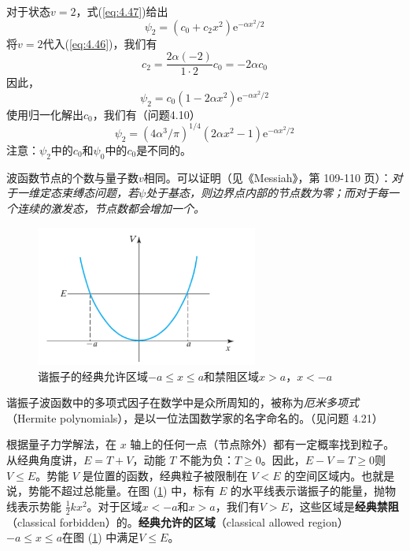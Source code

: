     对于状态$v=2$，式(\ref{eq:4.47})给出
    \begin{equation*}
        \psi_2 = \left(c_0 + c_2x^2\right)\mathrm{e}^{-\alpha x^2 / 2}
    \end{equation*}
    将$v=2$代入(\ref{eq:4.46})，我们有
    \begin{equation*}
        c_2 = \frac{2\alpha \left(-2\right)}{1\cdot2}c_0 = -2\alpha c_0
    \end{equation*}
    因此，
    \begin{equation}
        \psi_2 = c_0\left(1-2\alpha x^2\right)\mathrm{e}^{-\alpha x^2 / 2}
        \label{eq:4.56}
    \end{equation}
    使用归一化解出$c_0$，我们有（问题4.10）
    \begin{equation}
        \psi_2 = \left(4\alpha^3 / \pi\right)^{1/4}\left(2\alpha x^2 - 1\right)\mathrm{e}^{-\alpha x^2 / 2}
        \label{eq:4.57}
    \end{equation}
    注意：$\psi_2$中的$c_0$和$\psi_0$中的$c_0$是不同的。

    波函数节点的个数与量子数$v$相同。可以证明（见《Messiah》，第 109-110 页）：\textit{对于一维定态束缚态问题，若$\psi$处于基态，则边界点内部的节点数为零；而对于每一个连续的激发态，节点数都会增加一个。}
    \begin{figure}[h!]
        \centering
        \includegraphics[width=0.65\textwidth]{Figures/4.5.png}
        \caption{
            谐振子的经典允许区域$-a \le x \le a$和禁阻区域$x > a$，$x < -a$
        }
        \label{fig:4.5}
    \end{figure}

    谐振子波函数中的多项式因子在数学中是众所周知的，被称为\textit{厄米多项式}（Hermite polynomials），是以一位法国数学家的名字命名的。（见问题 4.21）

    根据量子力学解法，在 $x$ 轴上的任何一点（节点除外）都有一定概率找到粒子。从经典角度讲，$E=T+V$，动能 $T$ 不能为负：$T \ge 0$。因此，$E-V = T \ge 0$则$V \le E$。势能 $V$ 是位置的函数，经典粒子被限制在 $V<E$ 的空间区域内。也就是说，势能不超过总能量。在图 (\ref{fig:4.5}) 中，标有 $E$ 的水平线表示谐振子的能量，抛物线表示势能 $\frac{1}{2}kx^2$。对于区域$x < -a$和$x > a$，我们有$V>E$，这些区域是\textbf{经典禁阻}（classical forbidden）的。\textbf{经典允许的区域}（classical allowed region） $-a \le x \le a$在图 (\ref{fig:4.5}) 中满足$V\le E$。

